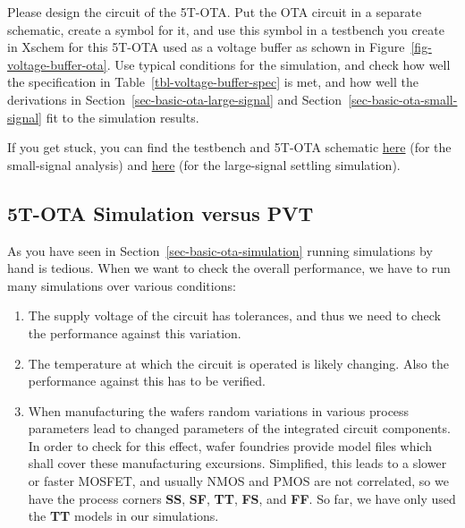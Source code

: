 \documentclass[
  a4paper,
  DIV=11,
  numbers=noendperiod]{scrartcl}
\providecommand{\tightlist}{%
  \setlength{\itemsep}{0pt}\setlength{\parskip}{0pt}}\usepackage{longtable,booktabs,array}
\begin{document}
\begin{tcolorbox}[enhanced jigsaw, breakable, title=\textcolor{quarto-callout-tip-color}{\faLightbulb}\hspace{0.5em}{Exercise: 5T-OTA Design and Testbench}, left=2mm, bottomrule=.15mm, opacitybacktitle=0.6, opacityback=0, colframe=quarto-callout-tip-color-frame, leftrule=.75mm, bottomtitle=1mm, colbacktitle=quarto-callout-tip-color!10!white, toprule=.15mm, rightrule=.15mm, toptitle=1mm, titlerule=0mm, arc=.35mm, colback=white, coltitle=black]

Please design the circuit of the 5T-OTA. Put the OTA circuit in a
separate schematic, create a symbol for it, and use this symbol in a
testbench you create in Xschem for this 5T-OTA used as a voltage buffer
as schown in Figure~\ref{fig-voltage-buffer-ota}. Use typical conditions
for the simulation, and check how well the specification in
Table~\ref{tbl-voltage-buffer-spec} is met, and how well the derivations
in Section~\ref{sec-basic-ota-large-signal} and
Section~\ref{sec-basic-ota-small-signal} fit to the simulation results.

If you get stuck, you can find the testbench and 5T-OTA schematic
\href{./xschem/ota-5t_tb-ac.svg}{here} (for the small-signal analysis)
and \href{./xschem/ota-5t_tb-ac.svg}{here} (for the large-signal
settling simulation).

\end{tcolorbox}

\subsection{5T-OTA Simulation versus
PVT}\label{t-ota-simulation-versus-pvt}

As you have seen in Section~\ref{sec-basic-ota-simulation} running
simulations by hand is tedious. When we want to check the overall
performance, we have to run many simulations over various conditions:

\begin{enumerate}
\def\labelenumi{\arabic{enumi}.}
\tightlist
\item
  The supply voltage of the circuit has tolerances, and thus we need to
  check the performance against this variation.
\item
  The temperature at which the circuit is operated is likely changing.
  Also the performance against this has to be verified.
\item
  When manufacturing the wafers random variations in various process
  parameters lead to changed parameters of the integrated circuit
  components. In order to check for this effect, wafer foundries provide
  model files which shall cover these manufacturing excursions.
  Simplified, this leads to a slower or faster MOSFET, and usually NMOS
  and PMOS are not correlated, so we have the process corners
  \textbf{SS}, \textbf{SF}, \textbf{TT}, \textbf{FS}, and \textbf{FF}.
  So far, we have only used the \textbf{TT} models in our simulations.
\end{enumerate}
\end{document}
